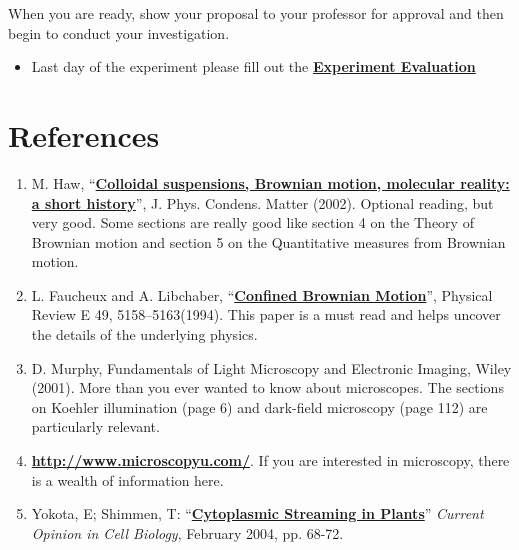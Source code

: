 \documentclass{../lab}
\begin{document}
When you are ready, show your proposal to your professor for approval and then begin to conduct your investigation.

\begin{itemize}
    \item Last day of the experiment please fill out the \href{\ExperimentEvaluation}{\textbf{Experiment Evaluation}}

\end{itemize}

\section{References}
\label{sec:References}

\begin{enumerate}
    \item M. Haw, ``\href{http://physics111.lib.berkeley.edu/Physics111/Reprints/BMC/Colloidal\%20Suspensions\%20-\%20Haw.pdf}{\textbf{Colloidal suspensions, Brownian motion, molecular reality: a short history}}'', J. Phys. Condens. Matter (2002). Optional reading, but very good. Some sections are really good like section 4 on the Theory of Brownian motion and section 5 on the Quantitative measures from Brownian motion.

    \item L. Faucheux and A. Libchaber, ``\href{http://physics111.lib.berkeley.edu/Physics111/Reprints/BMC/BMC\_Reprints/Faucheux-Libchaber-Confined\_Brownian\_Motion.pdf}{\textbf{Confined Brownian Motion}}'', Physical Review E 49, 5158–5163(1994). This paper is a must read and helps uncover the details of the underlying physics.

    \item D. Murphy, Fundamentals of Light Microscopy and Electronic Imaging, Wiley (2001). More than you ever wanted to know about microscopes. The sections on Koehler illumination (page 6) and dark-field microscopy (page 112) are particularly relevant.

    \item \href{http://www.microscopyu.com/}{\textbf{http://www.microscopyu.com/}}. If you are interested in microscopy, there is a wealth of information here.

    \item Yokota, E; Shimmen, T: ``\href{http://physics111.lib.berkeley.edu/Physics111/Reprints/BMC/Cytoplasmic_Streaming-Shimmen.pdf}{\textbf{Cytoplasmic Streaming in Plants}}'' \emph{Current Opinion in Cell Biology}, February 2004, pp. 68-72.


\end{enumerate}
\end{document}

